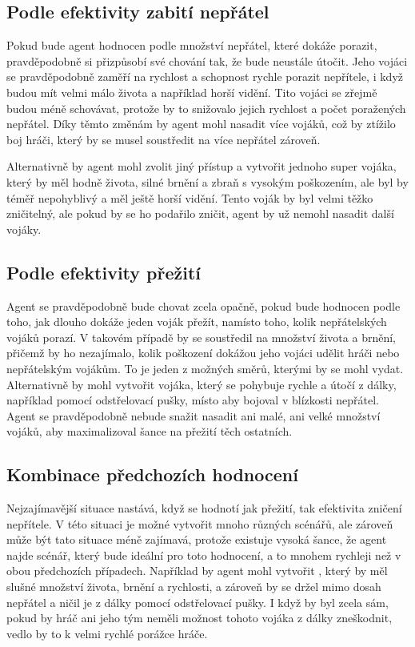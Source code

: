 \subsection{Podle efektivity zabití nepřátel}
Pokud bude agent hodnocen podle množství nepřátel, které dokáže porazit, pravděpodobně si přizpůsobí své chování tak, že bude neustále útočit. Jeho vojáci se pravděpodobně zaměří na rychlost a schopnost rychle porazit nepřítele, i když budou mít velmi málo života a například horší vidění. Tito vojáci se zřejmě budou méně schovávat, protože by to snižovalo jejich rychlost a počet poražených nepřátel. Díky těmto změnám by agent mohl nasadit více vojáků, což by ztížilo boj hráči, který by se musel soustředit na více nepřátel zároveň.

Alternativně by agent mohl zvolit jiný přístup a vytvořit jednoho super vojáka, který by měl hodně života, silné brnění a zbraň s vysokým poškozením, ale byl by téměř nepohyblivý a měl ještě horší vidění. Tento voják by byl velmi těžko zničitelný, ale pokud by se ho podařilo zničit, agent by už nemohl nasadit další vojáky.

\subsection{Podle efektivity přežití}
Agent se pravděpodobně bude chovat zcela opačně, pokud bude hodnocen podle toho, jak dlouho dokáže jeden voják přežít, namísto toho, kolik nepřátelských vojáků porazí. V takovém případě by se soustředil na množství života a brnění, přičemž by ho nezajímalo, kolik poškození dokážou jeho vojáci udělit hráči nebo nepřátelským vojákům. To je jeden z možných směrů, kterými by se mohl vydat. Alternativně by mohl vytvořit vojáka, který se pohybuje rychle a útočí z dálky, například pomocí odstřelovací pušky, místo aby bojoval v blízkosti nepřátel. Agent se pravděpodobně nebude snažit nasadit ani malé, ani velké množství vojáků, aby maximalizoval šance na přežití těch ostatních.

\subsection{Kombinace předchozích hodnocení}
Nejzajímavější situace nastává, když se hodnotí jak přežití, tak efektivita zničení nepřítele. V této situaci je možné vytvořit mnoho různých scénářů, ale zároveň může být tato situace méně zajímavá, protože existuje vysoká šance, že agent najde scénář, který bude ideální pro toto hodnocení, a to mnohem rychleji než v obou předchozích případech. Například by agent mohl vytvořit , který by měl slušné množství života, brnění a rychlosti, a zároveň by se držel mimo dosah nepřátel a ničil je z dálky pomocí odstřelovací pušky. I když by byl zcela sám, pokud by hráč ani jeho tým neměli možnost tohoto vojáka z dálky zneškodnit, vedlo by to k velmi rychlé porážce hráče.